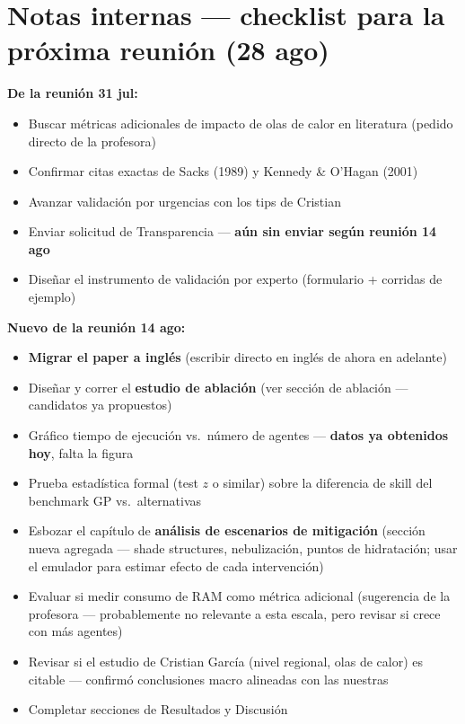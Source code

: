 \documentclass[11pt,a4paper]{article}
\begin{document}
\section*{Notas internas --- checklist para la próxima reunión (28 ago)}
{\small
\textbf{De la reunión 31 jul:}
\begin{itemize}[leftmargin=*]
    \item[$\square$] Buscar métricas adicionales de impacto de olas de calor
        en literatura (pedido directo de la profesora)
    \item[$\square$] Confirmar citas exactas de Sacks (1989) y Kennedy \&
        O'Hagan (2001)
    \item[$\square$] Avanzar validación por urgencias con los tips de
        Cristian
    \item[$\square$] Enviar solicitud de Transparencia --- \textbf{aún sin
        enviar según reunión 14 ago}
    \item[$\square$] Diseñar el instrumento de validación por experto
        (formulario + corridas de ejemplo)
\end{itemize}

\textbf{Nuevo de la reunión 14 ago:}
\begin{itemize}[leftmargin=*]
    \item[$\square$] \textbf{Migrar el paper a inglés} (escribir directo en
        inglés de ahora en adelante)
    \item[$\square$] Diseñar y correr el \textbf{estudio de ablación}
        (ver sección de ablación --- candidatos ya propuestos)
    \item[$\boxminus$] Gráfico tiempo de ejecución vs.\ número de agentes ---
        \textbf{datos ya obtenidos hoy}, falta la figura
    \item[$\square$] Prueba estadística formal (test $z$ o similar) sobre la
        diferencia de skill del benchmark GP vs.\ alternativas
    \item[$\square$] Esbozar el capítulo de \textbf{análisis de escenarios de
        mitigación} (sección nueva agregada --- shade structures,
        nebulización, puntos de hidratación; usar el emulador para estimar
        efecto de cada intervención)
    \item[$\square$] Evaluar si medir consumo de RAM como métrica adicional
        (sugerencia de la profesora --- probablemente no relevante a esta
        escala, pero revisar si crece con más agentes)
    \item[$\square$] Revisar si el estudio de Cristian García (nivel
        regional, olas de calor) es citable --- confirmó conclusiones
        macro alineadas con las nuestras
    \item[$\square$] Completar secciones de Resultados y Discusión
\end{itemize}
}
\end{document}
